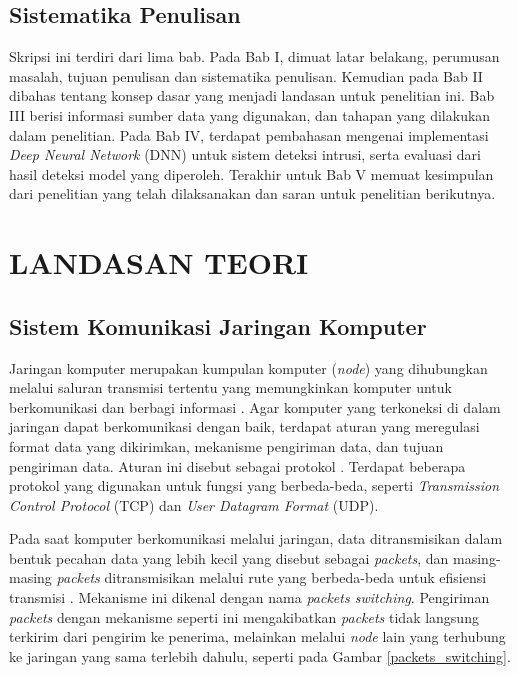 \documentclass[a4paper,12pt]{report}
\begin{document}
\section{Sistematika Penulisan}

Skripsi ini terdiri dari lima bab. Pada Bab I, dimuat latar belakang, perumusan masalah, tujuan penulisan dan sistematika penulisan. Kemudian pada Bab II dibahas tentang konsep dasar yang menjadi landasan untuk penelitian ini. Bab III berisi informasi sumber data yang digunakan, dan tahapan yang dilakukan dalam penelitian. Pada Bab IV, terdapat pembahasan mengenai implementasi \textit{Deep Neural Network} (DNN) untuk sistem deteksi intrusi, serta evaluasi dari hasil deteksi model yang diperoleh. Terakhir untuk Bab V memuat kesimpulan dari penelitian yang telah dilaksanakan dan saran untuk penelitian berikutnya.

\chapter{LANDASAN TEORI}
\thispagestyle{empty}

\section{Sistem Komunikasi Jaringan Komputer}
Jaringan komputer merupakan kumpulan komputer (\textit{node}) yang dihubungkan melalui saluran transmisi tertentu yang memungkinkan komputer untuk berkomunikasi dan berbagi informasi \cite{robertazziIntroductionComputerNetworking2017}. Agar komputer yang terkoneksi di dalam jaringan dapat berkomunikasi dengan baik, terdapat aturan yang meregulasi format data yang dikirimkan, mekanisme pengiriman data, dan tujuan pengiriman data. Aturan ini disebut sebagai protokol \cite{tanenbaumComputerNetworks2011}. Terdapat beberapa protokol yang digunakan untuk fungsi yang berbeda-beda, seperti \textit{Transmission Control Protocol} (TCP) dan \textit{User Datagram Format} (UDP). 

Pada saat komputer berkomunikasi melalui jaringan, data ditransmisikan dalam bentuk pecahan data yang lebih kecil yang disebut sebagai \textit{packets}, dan masing-masing \textit{packets} ditransmisikan melalui rute yang berbeda-beda untuk efisiensi transmisi \cite{tanenbaumComputerNetworks2011}\cite{robertazziIntroductionComputerNetworking2017}. Mekanisme ini dikenal dengan nama \textit{packets switching}. Pengiriman \textit{packets} dengan mekanisme seperti ini mengakibatkan \textit{packets} tidak langsung terkirim dari pengirim ke penerima, melainkan melalui \textit{node} lain yang terhubung ke jaringan yang sama terlebih dahulu, seperti pada Gambar \ref{packets_switching}.
\end{document}
